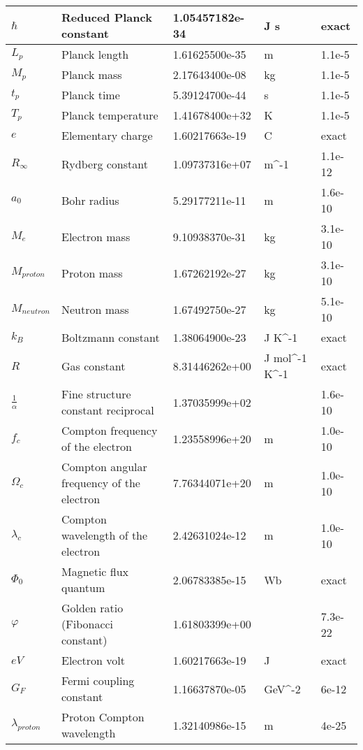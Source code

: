 \documentclass{article}%
\begin{document}
\begin{table}[H]
\begin{tabular}{|p{1.5cm}|p{6cm}|p{2.5cm}|p{2cm}|p{2cm}|}
        $\hbar$ & Reduced Planck constant & 1.05457182e-34 & J s & exact \\ \hline%
        $L_p$ & Planck length & 1.61625500e-35 & m & 1.1e-5 \\ \hline%
        $M_p$ & Planck mass & 2.17643400e-08 & kg & 1.1e-5 \\ \hline%
        $t_p$ & Planck time & 5.39124700e-44 & s & 1.1e-5 \\ \hline%
        $T_p$ & Planck temperature & 1.41678400e+32 & K & 1.1e-5 \\ \hline%
        $e$ & Elementary charge & 1.60217663e-19 & C & exact \\ \hline%
        $R_\infty$ & Rydberg constant & 1.09737316e+07 & m^-1 & 1.1e-12 \\ \hline%
        $a_0$ & Bohr radius & 5.29177211e-11 & m & 1.6e-10 \\ \hline%
        $M_e$ & Electron mass & 9.10938370e-31 & kg & 3.1e-10 \\ \hline%
        $M_{proton}$ & Proton mass & 1.67262192e-27 & kg & 3.1e-10 \\ \hline%
        $M_{neutron}$ & Neutron mass & 1.67492750e-27 & kg & 5.1e-10 \\ \hline%
        $k_B$ & Boltzmann constant & 1.38064900e-23 & J K^-1 & exact \\ \hline%
        $R$ & Gas constant & 8.31446262e+00 & J mol^-1 K^-1 & exact \\ \hline%
        $\frac{1}{\alpha}$ & Fine structure constant reciprocal & 1.37035999e+02 &  & 1.6e-10 \\ \hline%
        $f_c$ & Compton frequency of the electron & 1.23558996e+20 & m & 1.0e-10 \\ \hline%
        $\Omega_c$ & Compton angular frequency of the electron & 7.76344071e+20 & m & 1.0e-10 \\ \hline%
        $\lambda_c$ & Compton wavelength of the electron & 2.42631024e-12 & m & 1.0e-10 \\ \hline%
        $\Phi_0$ & Magnetic flux quantum & 2.06783385e-15 & Wb & exact \\ \hline%
        $\varphi$ & Golden ratio (Fibonacci constant) & 1.61803399e+00 &  & 7.3e-22 \\ \hline%
        $eV$ & Electron volt & 1.60217663e-19 & J & exact \\ \hline%
        $G_F$ & Fermi coupling constant & 1.16637870e-05 & GeV^-2 & 6e-12 \\ \hline%
        $\lambda_{proton}$ & Proton Compton wavelength & 1.32140986e-15 & m & 4e-25 \\ \hline%

\end{tabular}
\end{table}
\end{document}
